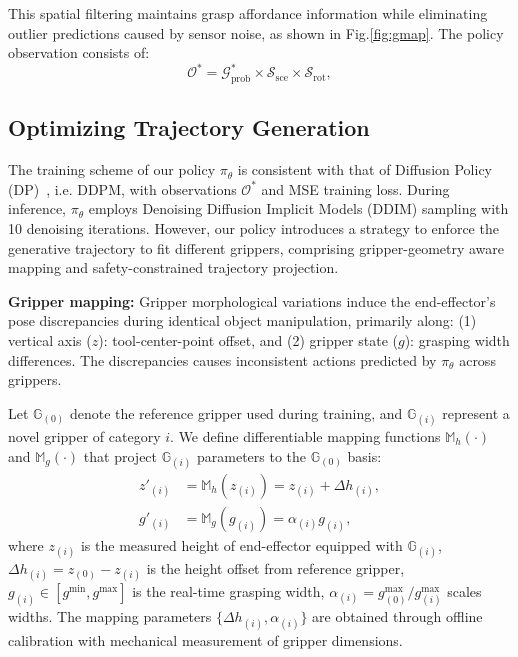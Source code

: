 This spatial filtering maintains grasp affordance information while eliminating outlier predictions caused by sensor noise, as shown in Fig.\ref{fig:gmap}. The policy observation consists of:
\begin{equation}
    \label{eq:obs}
    \mathcal{O}^* = \mathcal{G}^*_{\text{prob}}\times \mathcal{S}_{\text{sce}}\times \mathcal{S}_{\text{rot}},
\end{equation}

\subsection{Optimizing Trajectory Generation} 
\label{sec:optimization}
The training scheme of our policy $\pi_{\theta}$ is consistent with that of Diffusion Policy (DP)~\cite{chi2023diffusion}, i.e. DDPM, with observations $\mathcal{O}^*$ and MSE training loss. During inference, $\pi_{\theta}$ employs Denoising Diffusion Implicit Models (DDIM)\cite{song2021denoising} sampling with 10 denoising iterations. However, our policy introduces a strategy to enforce the generative trajectory to fit different grippers, comprising gripper-geometry aware mapping and safety-constrained trajectory  projection. 


\textbf{Gripper mapping:} Gripper morphological variations induce the end-effector's pose discrepancies during identical object manipulation, primarily along: (1) vertical axis ($z$): tool-center-point offset, and (2) gripper state ($g$): grasping width differences. The discrepancies causes inconsistent actions predicted by $\pi_\theta$ across grippers.

Let $\mathbb{G}_{(0)}$ denote the reference gripper used during training, and $\mathbb{G}_{(i)}$ represent a novel gripper of category $i$. We define differentiable mapping functions $\mathds{M}_h(\cdot)$ and $\mathds{M}_g(\cdot)$ that project $\mathbb{G}_{(i)}$ parameters to the $\mathbb{G}_{(0)}$ basis: 
\begin{equation}
\label{eq:gripper_mapping}
\begin{aligned}
    z'_{(i)} &= \mathds{M}_h(z_{(i)}) = z_{(i)} + \Delta h_{(i)}, \\
    g'_{(i)} &= \mathds{M}_g(g_{(i)}) = \alpha_{(i)} g_{(i)},
\end{aligned}
\end{equation}
where $z_{(i)}$ is the measured height of end-effector equipped with $\mathbb{G}_{(i)}$, $\Delta h_{(i)} = z_{(0)} - z_{(i)}$ is the height offset from reference gripper, $g_{(i)} \in [g^{\min}, g^{\max}]$ is the real-time grasping width, $\alpha_{(i)} = {g^{\max}_{(0)}}/{g^{\max}_{(i)}}$ scales widths. The mapping parameters $\{\Delta h_{(i)}, \alpha_{(i)}\}$ are obtained through offline calibration with mechanical measurement of gripper dimensions. 

